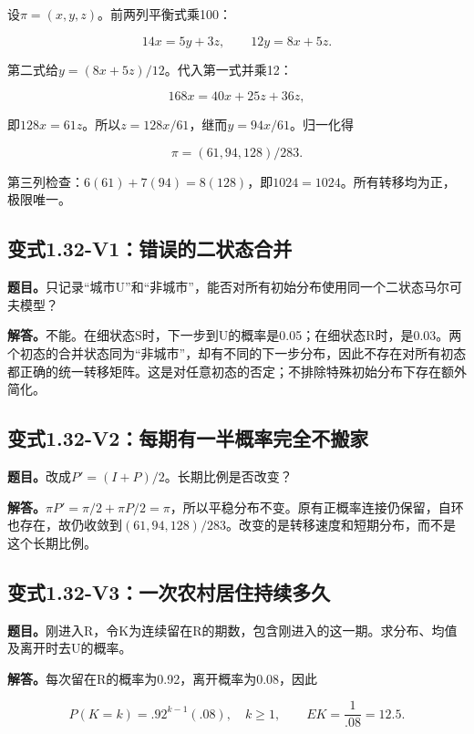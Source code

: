 \documentclass[
  11pt,
  a4paper,
  UTF8,
  fontset=fandol]{ctexart}
\begin{document}
设\(\pi=(x,y,z)\)。前两列平衡式乘100：

\[
14x=5y+3z,\qquad12y=8x+5z.
\]

第二式给\(y=(8x+5z)/12\)。代入第一式并乘12：

\[
168x=40x+25z+36z,
\]

即\(128x=61z\)。所以\(z=128x/61\)，继而\(y=94x/61\)。归一化得

\[
\boxed{\pi=(61,94,128)/283.}
\]

第三列检查：\(6(61)+7(94)=8(128)\)，即\(1024=1024\)。所有转移均为正，极限唯一。

\subsection{变式1.32-V1：错误的二状态合并}\label{ux53d8ux5f0f1.32-v1ux9519ux8befux7684ux4e8cux72b6ux6001ux5408ux5e76}

\textbf{题目。}只记录``城市U''和``非城市''，能否对所有初始分布使用同一个二状态马尔可夫模型？

\textbf{解答。}不能。在细状态S时，下一步到U的概率是0.05；在细状态R时，是0.03。两个初态的合并状态同为``非城市''，却有不同的下一步分布，因此不存在对所有初态都正确的统一转移矩阵。这是对任意初态的否定；不排除特殊初始分布下存在额外简化。

\subsection{变式1.32-V2：每期有一半概率完全不搬家}\label{ux53d8ux5f0f1.32-v2ux6bcfux671fux6709ux4e00ux534aux6982ux7387ux5b8cux5168ux4e0dux642cux5bb6}

\textbf{题目。}改成\(P'=(I+P)/2\)。长期比例是否改变？

\textbf{解答。}\(\pi P'=\pi/2+\pi P/2=\pi\)，所以平稳分布不变。原有正概率连接仍保留，自环也存在，故仍收敛到\((61,94,128)/283\)。改变的是转移速度和短期分布，而不是这个长期比例。

\subsection{变式1.32-V3：一次农村居住持续多久}\label{ux53d8ux5f0f1.32-v3ux4e00ux6b21ux519cux6751ux5c45ux4f4fux6301ux7eedux591aux4e45}

\textbf{题目。}刚进入R，令K为连续留在R的期数，包含刚进入的这一期。求分布、均值及离开时去U的概率。

\textbf{解答。}每次留在R的概率为0.92，离开概率为0.08，因此

\[
P(K=k)=.92^{k-1}(.08),\quad k\ge1,
\qquad EK=\frac1{.08}=\boxed{12.5}.
\]
\end{document}
